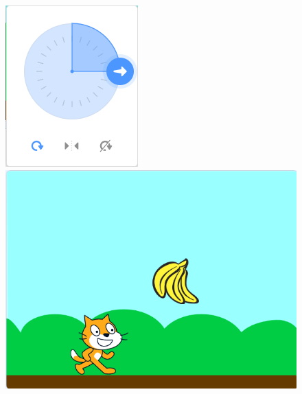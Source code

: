 \documentclass[10pt, a4paper]{article}
\begin{document}
\begin{enumerate}
        \begin{figure}[htbp]
            \centering
            \begin{minipage}[t]{.4\textwidth}
                \centering
                \begin{minipage}[t]{.17\textwidth}
                    \centering
                    \includegraphics[width=\textwidth]{9-1.png}
                \end{minipage}
                \begin{minipage}[t]{.4\textwidth}
                    \centering
                    \includegraphics[width=1\textwidth]{9-2.png}

\end{minipage}
\end{minipage}
\end{figure}
\end{enumerate}
\end{document}
